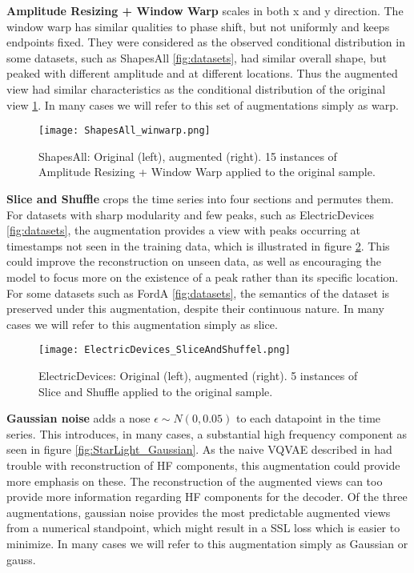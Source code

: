 \documentclass[../../thesis.tex]{subfiles}
\begin{document}
\textbf{Amplitude Resizing + Window Warp} scales in both x and y direction. The window warp has similar qualities to phase shift, but not uniformly and keeps endpoints fixed. They were considered as the observed conditional distribution in some datasets, such as ShapesAll \ref{fig:datasets}, had similar overall shape, but peaked with different amplitude and at different locations. Thus the augmented view had similar characteristics as the conditional distribution of the original view \ref{fig:ShapesAll_winwarp}. In many cases we will refer to this set of augmentations simply as warp. \newline

\begin{figure}[h]
    \centering
    \texttt{[image: ShapesAll\_winwarp.png]}
    \caption{ShapesAll: Original (left), augmented (right). 15 instances of Amplitude Resizing + Window Warp applied to the original sample.}
    \label{fig:ShapesAll_winwarp}
\end{figure}

\textbf{Slice and Shuffle} crops the time series into four sections and permutes them. For datasets with sharp modularity and few peaks, such as ElectricDevices \ref{fig:datasets}, the augmentation provides a view with peaks occurring at timestamps not seen in the training data, which is illustrated in figure \ref{fig:ElectricDevices_SliceAndShuffel}. This could improve the reconstruction on unseen data, as well as encouraging the model to focus more on the existence of a peak rather than its specific location. For some datasets such as FordA \ref{fig:datasets}, the semantics of the dataset is preserved under this augmentation, despite their continuous nature. In many cases we will refer to this augmentation simply as slice.\newline
\begin{figure}[h]
    \texttt{[image: ElectricDevices\_SliceAndShuffel.png]}
    \centering
    \caption{ElectricDevices: Original (left), augmented (right). 5 instances of Slice and Shuffle applied to the original sample.}
    \label{fig:ElectricDevices_SliceAndShuffel}
\end{figure}


\textbf{Gaussian noise} adds a nose $\epsilon \sim N(0,0.05)$ to each datapoint in the time series. This introduces, in many cases, a substantial high frequency component as seen in figure \ref{fig:StarLight_Gaussian}. As the naive VQVAE described in \cite{TimeVQVAE} had trouble with reconstruction of HF components, this augmentation could provide more emphasis on these. The reconstruction of the augmented views can too provide more information regarding HF components for the decoder. Of the three augmentations, gaussian noise provides the most predictable augmented views from a numerical standpoint, which might result in a SSL loss which is easier to minimize. In many cases we will refer to this augmentation simply as Gaussian or gauss.
\end{document}

